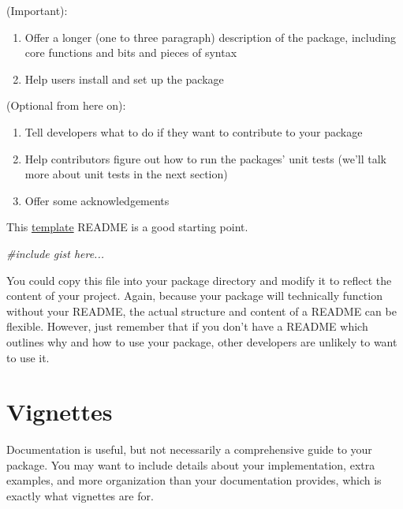 \documentclass[
]{book}
\newenvironment{Shaded}{\begin{snugshade}}{\end{snugshade}}
\newcommand{\CommentTok}[1]{\textcolor[rgb]{0.56,0.35,0.01}{\textit{#1}}}
\providecommand{\tightlist}{%
  \setlength{\itemsep}{0pt}\setlength{\parskip}{0pt}}
\begin{document}
(Important):

\begin{enumerate}
\def\labelenumi{\arabic{enumi}.}
\tightlist
\item
  Offer a longer (one to three paragraph) description of the package, including core functions and bits and pieces of syntax
\item
  Help users install and set up the package
\end{enumerate}

(Optional from here on):

\begin{enumerate}
\def\labelenumi{\arabic{enumi}.}
\setcounter{enumi}{2}
\item
  Tell developers what to do if they want to contribute to your package
\item
  Help contributors figure out how to run the packages' unit tests (we'll talk more about unit tests in the next section)
\item
  Offer some acknowledgements
\end{enumerate}

This \href{https://gist.github.com/PurpleBooth/109311bb0361f32d87a2}{template} README is a good starting point.

\begin{Shaded}
\begin{Highlighting}[]
\CommentTok{\#include gist here...}
\end{Highlighting}
\end{Shaded}

You could copy this file into your package directory and modify it to reflect the content of your project. Again, because your package will technically function without your README, the actual structure and content of a README can be flexible. However, just remember that if you don't have a README which outlines why and how to use your package, other developers are unlikely to want to use it.

\hypertarget{vignettes}{%
\section{Vignettes}\label{vignettes}}

Documentation is useful, but not necessarily a comprehensive guide to your package. You may want to include details about your implementation, extra examples, and more organization than your documentation provides, which is exactly what vignettes are for.
\end{document}
